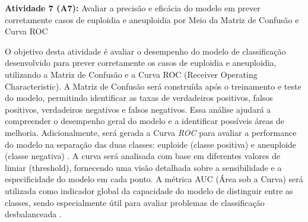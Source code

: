 \textbf{Atividade 7 (A7):} Avaliar a precisão e eficácia do modelo em prever corretamente casos de euploidia e aneuploidia  por Meio da Matriz de Confusão e Curva ROC

O objetivo desta atividade é avaliar o desempenho do modelo de classificação desenvolvido para prever corretamente os casos de euploidia e aneuploidia, utilizando a Matriz de Confusão e a Curva ROC (Receiver Operating Characteristic). A Matriz de Confusão será construída após o treinamento e teste do modelo, permitindo identificar as taxas de verdadeiros positivos, falsos positivos, verdadeiros negativos e falsos negativos. Essa análise ajudará a compreender o desempenho geral do modelo e a identificar possíveis áreas de melhoria. Adicionalmente, será gerada a Curva \textit{ROC} para avaliar a performance do modelo na separação das duas classes: euploide (classe positiva) e aneuploide (classe negativa) \cite{vilela2022}. A curva será analisada com base em diferentes valores de limiar (threshold), fornecendo uma visão detalhada sobre a sensibilidade e a especificidade do modelo em cada ponto. A métrica AUC (Área sob a Curva) será utilizada como indicador global da capacidade do modelo de distinguir entre as classes, sendo especialmente útil para avaliar problemas de classificação desbalanceada \cite{vilela2022}.

